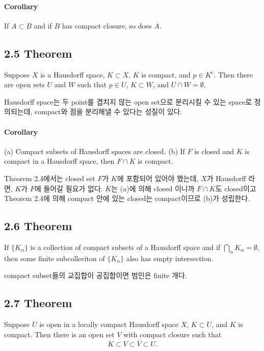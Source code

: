 \documentclass[11pt,reqno]{amsart}
\renewcommand{\(}{\left(}
\renewcommand{\)}{\right)}
\renewcommand{\[}{\left[}
\renewcommand{\]}{\right]}
\begin{document}
\paragraph{Corollary}

If $A \subset B$ and if $B$ has compact closure, so does $A$.

\subsection{2.5 Theorem}

Suppose $X$ is a Hausdorff space, $K \subset X$, $K$ is compact, and $p \in K^c$. Then there are open sets $U$ and $W$
such that $p \in U$, $K \subset W$, and $U \cap W = \emptyset$.

Hausdorff space는 두 point를 겹치지 않는 open set으로 분리시킬 수 있는 space로 정의되는데, compact와 점을 분리해낼 수 있다는 성질이
있다.

\paragraph{Corollary}

(a) Compact subsets of Hausdorff spaces are closed.
(b) If $F$ is closed and $K$ is compact in a Hausdorff space, then $F \cap K$ is compact.

Theorem 2.4에서는 closed set $F$가 $K$에 포함되어 있어야 했는데, $X$가 Hausdorff 라면, $K$가 $F$에 들어갈 필요가 없다.
$K$는 (a)에 의해 closed 이니까 $F \cap K$도 closed이고 Theorem 2.4에 의해 compact 안에 있는 closed는 compact이므로 (b)가 성립한다.

\subsection{2.6 Theorem}

If $\{ K_\alpha \}$ is a collection of compact subsets of a Hausdorff space and if $\bigcap _\alpha K _\alpha = \emptyset$, 
then some finite subcolleciton of $\{ K_\alpha \} $ also has empty intersection.

compact subset들의 교집합이 공집합이면 범인은 finite 개다.

\subsection{2.7 Theorem}

Suppose $U$ is open in a locally compact Hausdorff space $X$, $K \subset U$, and $K$ is compact. Then there is an open set $V$ 
with compact closure such that
\begin{equation}
  K \subset V \subset \bar{V} \subset U.
\end{equation}
\end{document}
